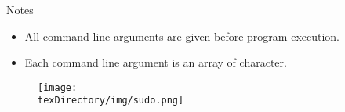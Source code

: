 \documentclass[compress]{beamer}
\begin{document}
\begin{slide}
	\begin{block}{Notes}

	\begin{itemize}
	\item[] All command line arguments are given before program execution.
	\item[] Each command line argument is an array of character.
	\end{itemize}

	\end{block}
\end{slide}

\begin{slide}
	\begin{figure}
	\texttt{[image: \\texDirectory/img/sudo.png]}
	\end{figure}
\end{slide}
\end{document}
